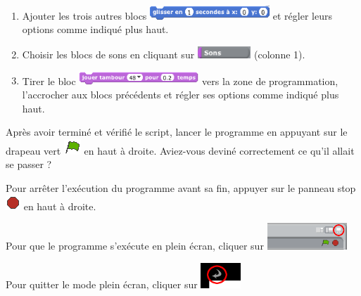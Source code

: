 \begin{enumerate}
\item Ajouter les trois autres blocs \includegraphics[width=4.5cm]{./images/scratch/BlocGlisser} et régler leurs options comme indiqué plus haut.
\item Choisir les blocs de sons en cliquant sur \includegraphics[width=2cm]{./images/scratch/BlocsSons} (colonne 1).
\item Tirer le bloc \includegraphics[width=4.5cm]{./images/scratch/BlocJouerTambour} vers la zone de programmation, l'accrocher aux blocs précédents et régler ses options comme indiqué plus haut.
\end{enumerate}

\vspace{12pt}

Après avoir terminé et vérifié le script, lancer le programme en appuyant sur le drapeau vert \includegraphics[width=.7cm]{./images/scratch/DrapeauVert} en haut à droite. Aviez-vous deviné correctement ce qu'il allait se passer ?

Pour arrêter l'exécution du programme avant sa fin, appuyer sur le panneau stop \includegraphics[width=.7cm]{./images/scratch/Stop} en haut à droite.

Pour que le programme s'exécute en plein écran, cliquer sur \includegraphics[width=3cm]{./images/scratch/ScratchPleinEcran}

Pour quitter le mode plein écran, cliquer sur \includegraphics[width=1.5cm]{./images/scratch/ScratchQuitterPleinEcran}








